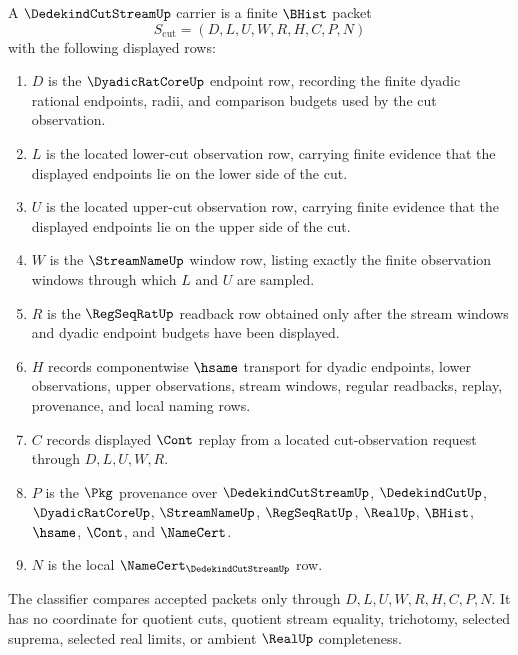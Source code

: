 \begin{definition}\label{def:dedekind-cut-stream-carrier}
A $\DedekindCutStreamUp$ carrier is a finite $\BHist$ packet
$$
S_{\mathrm{cut}}=(D,L,U,W,R,H,C,P,N)
$$
with the following displayed rows:
\begin{enumerate}
\item $D$ is the $\DyadicRatCoreUp$ endpoint row, recording the finite dyadic rational endpoints, radii, and comparison budgets used by the cut observation.
\item $L$ is the located lower-cut observation row, carrying finite evidence that the displayed endpoints lie on the lower side of the cut.
\item $U$ is the located upper-cut observation row, carrying finite evidence that the displayed endpoints lie on the upper side of the cut.
\item $W$ is the $\StreamNameUp$ window row, listing exactly the finite observation windows through which $L$ and $U$ are sampled.
\item $R$ is the $\RegSeqRatUp$ readback row obtained only after the stream windows and dyadic endpoint budgets have been displayed.
\item $H$ records componentwise $\hsame$ transport for dyadic endpoints, lower observations, upper observations, stream windows, regular readbacks, replay, provenance, and local naming rows.
\item $C$ records displayed $\Cont$ replay from a located cut-observation request through $D,L,U,W,R$.
\item $P$ is the $\Pkg$ provenance over $\DedekindCutStreamUp$, $\DedekindCutUp$, $\DyadicRatCoreUp$, $\StreamNameUp$, $\RegSeqRatUp$, $\RealUp$, $\BHist$, $\hsame$, $\Cont$, and $\NameCert$.
\item $N$ is the local $\NameCert_{\DedekindCutStreamUp}$ row.
\end{enumerate}
The classifier compares accepted packets only through $D,L,U,W,R,H,C,P,N$. It has no coordinate for quotient cuts, quotient stream equality, trichotomy, selected suprema, selected real limits, or ambient $\RealUp$ completeness.
\end{definition}

